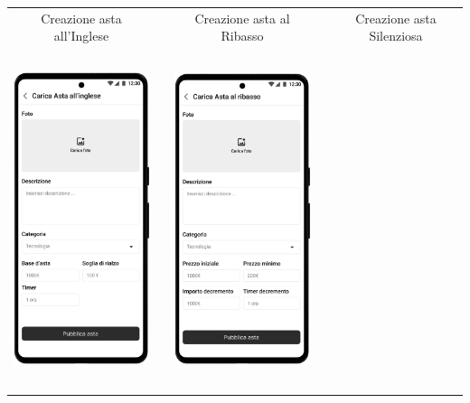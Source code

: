 \begin{center}
	\begin{tabular}{ccccc}
		Creazione asta all'Inglese                                                         &  &
		Creazione asta al Ribasso                                                          &  &
		Creazione asta Silenziosa                                                               \\
		\includegraphics[height=280pt]{images/mockup/Carica Asta 1.1 Asta all'Inglese.png} &  &
		\includegraphics[height=280pt]{images/mockup/Carica Asta 1.1 Asta al Ribasso.png}  &  &

\end{tabular}
\end{center}
